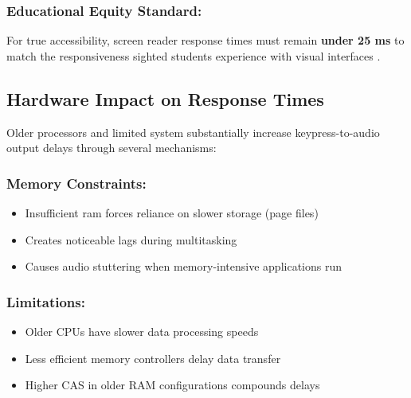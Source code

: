 \subsubsection{Educational Equity Standard:}

For true accessibility, screen reader response times must remain \textbf{under 25 ms} to match the responsiveness sighted students experience with visual interfaces \supercite{W3C2018WCAG21}.

\subsection{Hardware Impact on Response Times}\label{hardware-impact-on-response-times}

Older processors and limited system  substantially increase keypress-to-audio output delays through several mechanisms:

\subsubsection{Memory Constraints:}

\begin{itemize}
	\item Insufficient \gls{ram} forces reliance on slower storage (page files) \supercite{Microsoft2023WindowsPerformance}
	\item Creates noticeable lags during multitasking \supercite{Intel2024ProcessorMemory}
	\item Causes \gls{audio} stuttering when memory-intensive applications run \supercite{Realtek2023AudioDriverPerformance}
\end{itemize}


\subsubsection{ Limitations:}

\begin{itemize}
	\item Older CPUs have slower data processing speeds \supercite{AMD2024RyzenPerformance}
	\item Less efficient memory controllers delay data transfer \supercite{AnandTech2023MemoryControllers}
	\item Higher CAS  in older RAM configurations compounds delays \supercite{TechSpot2023RAMTimings}
\end{itemize}


